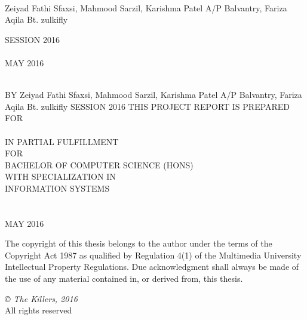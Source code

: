\documentclass[12pt, oneside]{Thesis}
\begin{document}
\begin{titlepage}
\begin{center}

{\LARGE \ttitle}\\[0.4cm] 
\vfill
\Large{Zeiyad Fathi Sfaxsi, Mahmood Sarzil, Karishma Patel A/P Balvantry, Fariza Aqila Bt. zulkifly} 

\vfill
\normalsize{SESSION 2016}
\vfill
\normalsize\FACNAME\\
\normalsize \UNIVNAME\\
{\normalsize MAY 2016}\\ 
\vfill
\end{center}

\end{titlepage}
\thispagestyle{empty}
\begin{center}

	{\LARGE \ttitle}\\[0.4cm] %
	\vfill
	\footnotesize{BY}
	\vfill
	\Large{Zeiyad Fathi Sfaxsi, Mahmood Sarzil, Karishma Patel A/P Balvantry, Fariza Aqila Bt. zulkifly} %
	\vfill
	\footnotesize{SESSION 2016}
	\vfill
	\footnotesize{THIS PROJECT REPORT IS PREPARED FOR}
	\vfil
	\normalsize\FACNAME\\
	\normalsize \UNIVNAME\\
	\normalsize{IN PARTIAL FULFILLMENT}\\
	\normalsize{FOR}\\
	\vfil
	\normalsize{BACHELOR OF COMPUTER SCIENCE (HONS)}\\
	\normalsize{WITH SPECIALIZATION IN}\\
	\normalsize{INFORMATION SYSTEMS}\\
	\vfil
	\normalsize\FACNAME\\
	\vfil
	\Large \UNIVNAME\\
	\vfil
	{\normalsize MAY 2016}\\ %
	\vfill
\end{center}

\newpage
\thispagestyle{empty}

The copyright of this thesis belongs to the author under the terms of the Copyright Act 1987 as qualified by Regulation 4(1) of the Multimedia University Intellectual Property Regulations. Due acknowledgment shall always be made of the use of any material contained in, or derived from, this thesis. 

\vfil
\textit{© The Killers, 2016}\\
All rights reserved
\end{document}
